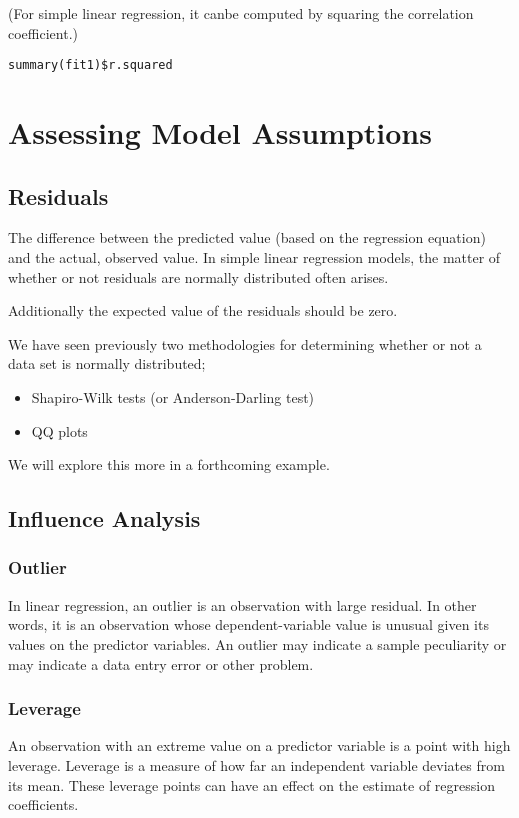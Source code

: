 (For simple linear regression, it canbe computed by squaring the correlation coefficient.)

\begin{framed}
\begin{verbatim}
summary(fit1)$r.squared
\end{verbatim}
\end{framed}
\newpage
\section{Assessing Model Assumptions}
\subsection{Residuals}  The difference between the predicted value (based on the regression equation) and the actual, observed value. In simple linear regression models, the matter of whether or not residuals are normally distributed often arises.

Additionally the expected value of the residuals should be zero.

We have seen previously two methodologies for determining whether or not a data set is normally distributed;

\begin{itemize} \item 	Shapiro-Wilk tests (or Anderson-Darling test)
\item 	QQ plots
\end{itemize}

We will explore this more in a forthcoming example.
\subsection{Influence Analysis}


\subsubsection{Outlier} In linear regression, an outlier is an observation with large residual.  In other words, it is an observation whose dependent-variable value is unusual given its values on the predictor variables.  An outlier may indicate a sample peculiarity or may indicate a data entry error or other problem.
\subsubsection{Leverage}  An observation with an extreme value on a predictor variable is a point with high leverage.  Leverage is a measure of how far an independent variable deviates from its mean.  These leverage points can have an effect on the estimate of regression coefficients.

